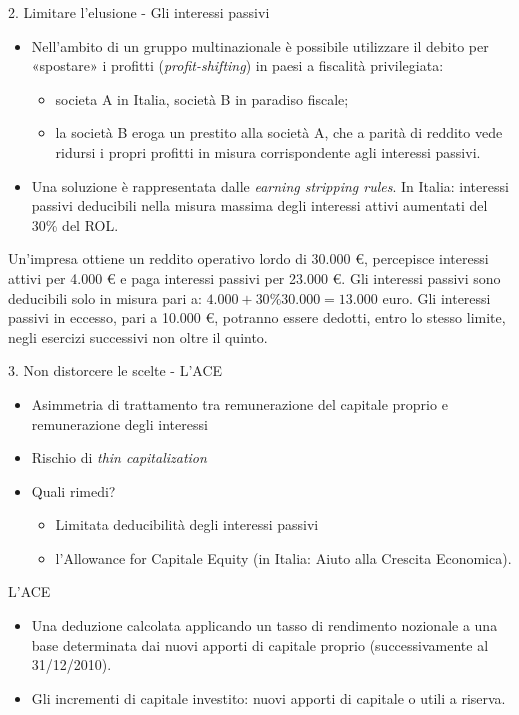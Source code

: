 \documentclass[11pt,italian]{beamer}
\begin{document}
\begin{frame}{2. Limitare l'elusione - Gli interessi passivi}
\begin{itemize}
\item Nell'ambito di un gruppo multinazionale è possibile utilizzare il debito per
«spostare» i profitti (\emph{profit-shifting}) in paesi a fiscalità privilegiata:
\begin{itemize}
\item societa A in Italia, società B in paradiso fiscale;
\item la società B eroga un prestito alla società A, che a parità di reddito
vede ridursi i propri profitti in misura corrispondente agli interessi
passivi.
\end{itemize}
\item Una soluzione è rappresentata dalle \emph{earning stripping rules}. In Italia:
interessi passivi deducibili nella misura massima degli interessi attivi
aumentati del 30\% del ROL.
\end{itemize}

\begin{example}[]
\small
Un'impresa ottiene un reddito operativo lordo di 30.000 €, percepisce
interessi attivi per 4.000 € e paga interessi passivi per 23.000 €.  Gli
interessi passivi sono deducibili solo in misura pari a: $4.000 + 30\% 30.000
= 13.000$ euro. Gli interessi passivi in eccesso, pari a 10.000 €, potranno
essere dedotti, entro lo stesso limite, negli esercizi successivi non oltre il
quinto.
\end{example}
\end{frame}


\begin{frame}{3. Non distorcere le scelte - L'ACE}
\begin{itemize}
\item Asimmetria di trattamento tra remunerazione del capitale proprio e
remunerazione degli interessi
\item Rischio di \emph{thin capitalization}
\item Quali rimedi?
\begin{itemize}
\item Limitata deducibilità degli interessi passivi
\item l'Allowance for Capitale Equity (in Italia: Aiuto alla Crescita Economica).
\end{itemize}
\end{itemize}
\begin{block}{L'ACE}
\begin{itemize}
\item Una deduzione calcolata applicando un tasso di rendimento nozionale a una
base determinata dai nuovi apporti di capitale proprio (successivamente al
31/12/2010).
\item Gli incrementi di capitale investito: nuovi apporti di capitale o utili a
riserva.
\end{itemize}
\end{block}
\end{frame}
\end{document}
